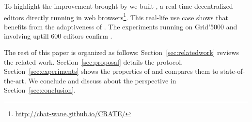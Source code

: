 To highlight the improvement brought by \SPRAY we built \CRATE, a real-time
decentralized editors directly running in web
browsers\footnote{\url{http://chat-wane.github.io/CRATE/}}. This real-life use
case shows that  benefits from the adaptiveness
of \SPRAY. The experiments running on Grid'5000 and involving uptill 600 editors
confirm .

The rest of this paper is organized as follows: Section~\ref{sec:relatedwork}
reviews the related work. Section~\ref{sec:proposal} details the \SPRAY
protocol. Section~\ref{sec:experiments} shows the properties of \SPRAY and
compares them to state-of-the-art. We conclude and discuss about the perspective
in Section~\ref{sec:conclusion}.

